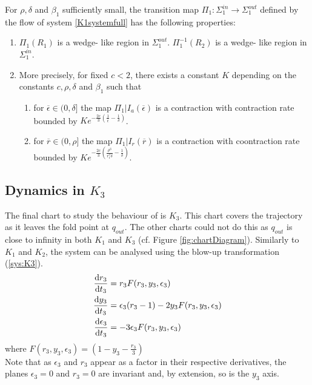 \begin{prop}
For $\rho, \delta$ and $\beta_1$ sufficiently small, the transition map $\Pi_1: \Sigma^{in}_1 \to \Sigma^{out}_1$ defined by the flow of system \ref{K1systemfull} has the following properties:
\begin{enumerate}
\item $\Pi_1(R_1)$ is a wedge- like region in $\Sigma^{out}_1$. $\Pi_1^{-1}(R_2)$  is a wedge- like region in $\Sigma^{in}_1$.
\item More precisely, for fixed $c<2$, there exists a constant $K$ depending on the constants $c, \rho, \delta$ and $\beta_1$ such that
\begin{enumerate}
\item for $\overline{\epsilon}\in (0, \delta] $ the map $\Pi_1 |I_a(\overline{\epsilon})$ is a contraction with contraction rate bounded by $Ke^{-\frac{2c}{3} \left(\frac{1}{\overline{\epsilon}} - \frac{1}{\delta} \right)}$.
\item for $\overline{r} \in (0, \rho] $ the map $\Pi_1 |I_r(\overline{r})$ is a contraction with coontraction rate bounded by $Ke^{-\frac{2c}{3} \left(\frac{\rho^3}{r_1^3 \delta} - \frac{1}{\delta} \right)}$.
\end{enumerate}
\end{enumerate}
\end{prop}

\subsection{Dynamics in \texorpdfstring{$K_3$}{K3}}\label{sec:dynamics-in-texorpdfstringk3k3}
The final chart to study the behaviour of is $K_3$. This chart covers the trajectory as it leaves the fold point at $q_{out}$. The other charts could not do this as $q_{out}$ is close to infinity in both $K_1$ and $K_3$ (cf. Figure \ref{fig:chartDiagram}). Similarly to $K_1$ and $K_2$, the system can be analysed using the blow-up transformation (\ref{sys:K3}).
\begin{subequations}
	\begin{align}
	\od{r_3}{t_3}&=r_3F(r_3,y_3,\epsilon_3) \\
	\od{y_3}{t_3}&=\epsilon_3(r_3-1)-2y_3F(r_3,y_3,\epsilon_3)\\
	\od{\epsilon_3}{t_3}&=-3\epsilon_3F(r_3,y_3,\epsilon_3)
	\end{align}
	\label{sys:K3blowup}
\end{subequations}
where $F(r_3,y_3,\epsilon_3)=\left(1-y_3-\frac{r_3}{3}\right)$ \\
Note that as $\epsilon_3$ and $r_3$ appear as a factor in their respective derivatives, the planes $\epsilon_3=0$ and $r_3=0$ are invariant and, by extension, so is the $y_3$ axis.\\

